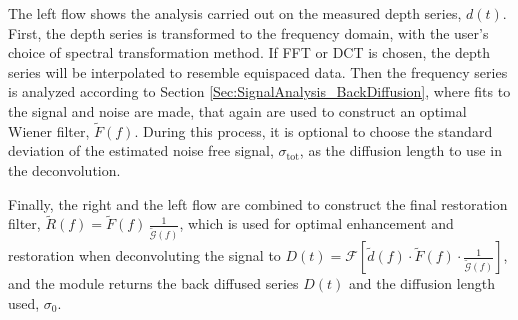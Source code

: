 \documentclass[../../CompleteThesis2/Complete_2ndDraft]{subfiles}
\begin{document}
The left flow shows the analysis carried out on the measured depth series, $d(t)$. First, the depth series is transformed to the frequency domain, with the user's choice of spectral transformation method. If FFT or DCT is chosen, the depth series will be interpolated to resemble equispaced data. Then the frequency series is analyzed according to Section \ref{Sec:SignalAnalysis_BackDiffusion}, where fits to the signal and noise are made, that again are used to construct an optimal Wiener filter, $\tilde{F}(f)$. During this process, it is optional to choose the standard deviation of the estimated noise free signal, $\sigma_{\text{tot}}$, as the diffusion length to use in the deconvolution.

Finally, the right and the left flow are combined to construct the final restoration filter, $\tilde{R}(f)=\tilde{F}(f)\,\frac{1}{\tilde{\mathcal{G}}(f)}$, which is used for optimal enhancement and restoration when deconvoluting the signal to $D(t)=\mathcal{F}\left[\tilde{d}(f)\cdot\tilde{F}(f)\cdot\frac{1}{\tilde{\mathcal{G}}(f)}\right]$, and the module returns the back diffused series $D(t)$ and the diffusion length used, $\sigma_{0}$.
\end{document}
